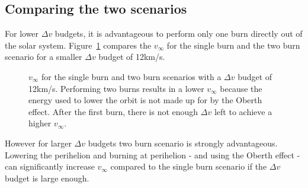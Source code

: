 \documentclass[12pt]{article} %
\begin{document}
\subsection{Comparing the two scenarios}

For lower $\Delta v$ budgets, it is advantageous to perform only one burn directly out of the solar system. Figure~\ref{fig:lowdv} compares the $v_{\infty}$ for the single burn and the two burn scenario for a smaller $\Delta v$ budget of 12km/s.

\begin{figure}[H]
\caption{$v_{\infty}$ for the single burn and two burn scenarios with a $\Delta v$ budget of 12km/s. Performing two burns results in a lower $v_{\infty}$ because the energy used to lower the orbit is not made up for by the Oberth effect. After the first burn, there is not enough $\Delta v$ left to achieve a higher $v_{\infty}$.}
\label{fig:lowdv}
\end{figure}

However for larger $\Delta v$ budgets two burn scenario is strongly advantageous. Lowering the perihelion and burning at perihelion - and using the Oberth effect - can significantly increase $v_{\infty}$ compared to the single burn scenario if the $\Delta v$ budget is large enough.
\end{document}
